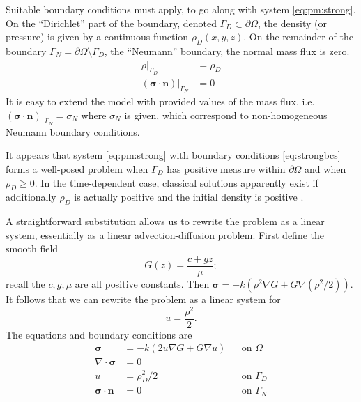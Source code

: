 \documentclass[11pt]{amsart}
\newcommand{\bn}{\mathbf{n}}
\newcommand{\bsigma}{\bm{\sigma}}
\newcommand{\Div}{\nabla\cdot}
\newcommand{\grad}{\nabla}
\begin{document}
Suitable boundary conditions must apply, to go along with system \eqref{eq:pm:strong}.  On the ``Dirichlet'' part of the boundary, denoted $\Gamma_D \subset \partial\Omega$, the density (or pressure) is given by a continuous function $\rho_D(x,y,z)$.  On the remainder of the boundary $\Gamma_N = \partial\Omega \setminus \Gamma_D$, the ``Neumann'' boundary, the normal mass flux is zero. 
\begin{subequations}
\label{eq:strongbcs}
\begin{align}
\rho|_{\Gamma_D}               &= \rho_D \\
(\bsigma\cdot \bn)|_{\Gamma_N} &= 0
\end{align}
\end{subequations}
It is easy to extend the model with provided values of the mass flux, i.e.~$(\bsigma\cdot \bn)|_{\Gamma_N}= \sigma_N$ where $\sigma_N$ is given, which correspond to non-homogeneous Neumann boundary conditions.

It appears that system \eqref{eq:pm:strong} with boundary conditions \eqref{eq:strongbcs} forms a well-posed problem when $\Gamma_D$ has positive measure within $\partial\Omega$ and when $\rho_D\ge 0$.  In the time-dependent case, classical solutions apparently exist if additionally $\rho_D$ is actually positive and the initial density is positive \citep[Theorem 3.1]{Vazquez2007}.

A straightforward substitution allows us to rewrite the problem as a linear system, essentially as a linear advection-diffusion problem.  First define the smooth field
\begin{equation}
G(z) = \frac{c + g z}{\mu};
\end{equation}
recall the $c,g,\mu$ are all positive constants.  Then $\bsigma = -k \left(\rho^2 \grad G + G \grad(\rho^2/2)\right)$.  It follows that we can rewrite the problem as a linear system for
\begin{equation}
u = \frac{\rho^2}{2}. \label{eq:pm:defu}
\end{equation}
The equations and boundary conditions are
\begin{subequations}
\label{eq:pm:strongu}
\begin{align}
\bsigma &= - k \left(2 u \grad G + G \grad u\right) & &\text{on } \Omega \label{eq:pm:strongu:darcy} \\
\Div \bsigma &= 0 & & \label{eq:pm:strongu:masscont} \\
u &= \rho_D^2/2 & &\text{on } \Gamma_D  \label{eq:pm:strongu:bcD} \\
\bsigma\cdot \bn &= 0 & &\text{on } \Gamma_N  \label{eq:pm:strongu:bcN} 
\end{align}
\end{subequations}
\end{document}
